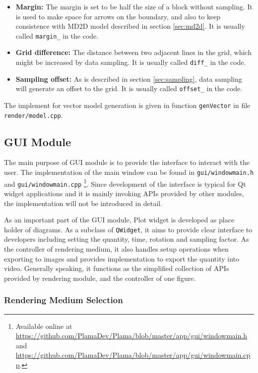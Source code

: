 \begin{itemize}
	\item \textbf{Margin:} The margin is set to be half the size of a block without sampling. It is used to make space for arrows on the boundary, and also to keep consistence with MD2D model described in section \ref{sec:md2d}. It is usually called \lstinline{margin_} in the code.
	\item \textbf{Grid difference:} The distance between two adjacent lines in the grid, which might be increased by data sampling. It is usually called \lstinline{diff_} in the code.
	\item \textbf{Sampling offset:} As is described in section \ref{sec:sampling}, data sampling will generate an offset to the grid. It is usually called \lstinline{offset_} in the code.
\end{itemize}

The implement for vector model generation is given in function \lstinline{genVector} in file \lstinline{render/model.cpp}.

\subsection{GUI Module}

The main purpose of GUI module is to provide the interface to interact with the user. The implementation of the main window can be found in \lstinline{gui/windowmain.h} and \lstinline{gui/windowmain.cpp} \footnote{Available online at \url{https://github.com/PlamaDev/Plama/blob/master/app/gui/windowmain.h} and \url{https://github.com/PlamaDev/Plama/blob/master/app/gui/windowmain.cpp}.}. Since development of the interface is typical for Qt widget applications and it is mainly invoking APIs provided by other modules, the implementation will not be introduced in detail.

As an important part of the GUI module, Plot widget is developed as place holder of diagrams. As a subclass of \lstinline{QWidget}, it aims to provide clear interface to developers including setting the quantity, time, rotation and sampling factor. As the controller of rendering medium, it also handles setup operations when exporting to images and provides implementation to export the quantity into video. Generally speaking, it functions as the simplified collection of APIs provided by rendering module, and the controller of one figure.

\subsubsection{Rendering Medium Selection} \label{sec:medium}

